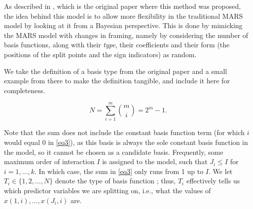 As described in \cite{denison1998bayesian}, which is the original paper where this method was proposed, the idea behind this model is to allow more flexibility in the traditional MARS model by looking at it from a Bayesian perspective. This is done by mimicking the MARS model with changes in framing, namely by considering the number of basis functions, along with their \textit{type}, their coefficients and their form (the positions of the split points and the sign indicators) as random.  

We take the definition of a basis type from the original paper and a small example from there to make the definition tangible, and include it here for completeness. 
\begin{definition}
	\begin{equation}
		N = \sum_{i=1}^{m} \binom{m}{i} = 2^m - 1. \label{eq3}
	\end{equation}	
\end{definition}

Note that the sum does not include the constant basis function term (for which $i$ would equal 0 in \eqref{eq3}), as this basis  is always the sole constant basis function in the model, so it cannot be chosen as a candidate basis. Frequently, some maximum order of interaction $I$ is assigned to the model, such that $J_i \leq I$ for $i = 1, \ldots, k$. In which case, the sum in \eqref{eq3} only runs from 1 up to $I$. We let $T_i \in \{1, 2, \ldots, N\}$ denote the type of basis function ; thus, $T_i$ effectively tells us which predictor variables we are splitting on, i.e., what the values of $x(1,i), \ldots, x(J_i,i)$ are.

